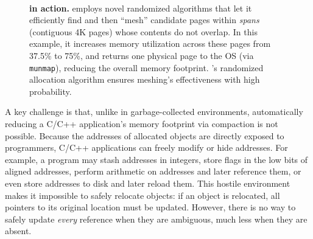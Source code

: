 \begin{figure}[t!]
  \centering
  ~~~~~
  \centering

  \caption{\textbf{\Mesh{} in action.} \Mesh{} employs novel
    randomized algorithms that let it efficiently find and then
    ``mesh'' candidate pages within \emph{spans} (contiguous 4K pages)
    whose contents do not overlap.  In this example, it increases
    memory utilization across these pages from 37.5\% to 75\%, and
    returns one physical page to the OS (via \texttt{munmap}),
    reducing the overall memory footprint. \Mesh{}'s randomized
    allocation algorithm ensures meshing's effectiveness with high
    probability.}

  \label{fig:meshing}
\end{figure}


A key challenge is that, unlike in garbage-collected environments,
automatically reducing a C/C++ application's memory footprint
via compaction is not possible. Because the addresses of allocated
objects are directly exposed to programmers, C/C++ applications can
freely modify or hide addresses.  For example, a program may stash
addresses in integers, store flags in the low bits of aligned
addresses, perform arithmetic on addresses and later reference them,
or even store addresses to disk and later reload them.  This hostile
environment makes it impossible to safely relocate objects: if an
object is relocated, all pointers to its original location must be
updated. However, there is no way to safely update \emph{every}
reference when they are ambiguous, much less when they are absent.

